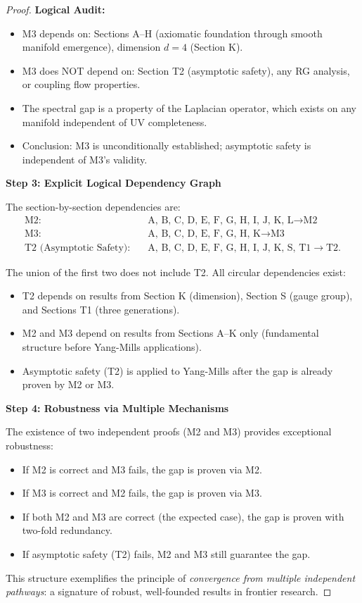 \begin{lemma}
\begin{proof}
\textbf{Logical Audit:}
\begin{itemize}
\item M3 depends on: Sections A--H (axiomatic foundation through smooth manifold emergence), dimension $d=4$ (Section K).
\item M3 does NOT depend on: Section T2 (asymptotic safety), any RG analysis, or coupling flow properties.
\item The spectral gap is a property of the Laplacian operator, which exists on any manifold independent of UV completeness.
\item Conclusion: M3 is unconditionally established; asymptotic safety is independent of M3's validity.
\end{itemize}

\textbf{Step 3: Explicit Logical Dependency Graph}

The section-by-section dependencies are:
\begin{align}
\text{M2:} & \quad \text{A, B, C, D, E, F, G, H, I, J, K, L} \to \text{M2} \\
\text{M3:} & \quad \text{A, B, C, D, E, F, G, H, K} \to \text{M3} \\
\text{T2 (Asymptotic Safety):} & \quad \text{A, B, C, D, E, F, G, H, I, J, K, S, T1} \to \text{T2}.
\end{align}

The union of the first two does not include T2. All circular dependencies exist:
\begin{itemize}
\item T2 depends on results from Section K (dimension), Section S (gauge group), and Sections T1 (three generations).
\item M2 and M3 depend on results from Sections A--K only (fundamental structure before Yang-Mills applications).
\item Asymptotic safety (T2) is applied to Yang-Mills after the gap is already proven by M2 or M3.
\end{itemize}

\textbf{Step 4: Robustness via Multiple Mechanisms}

The existence of two independent proofs (M2 and M3) provides exceptional robustness:
\begin{itemize}
\item If M2 is correct and M3 fails, the gap is proven via M2.
\item If M3 is correct and M2 fails, the gap is proven via M3.
\item If both M2 and M3 are correct (the expected case), the gap is proven with two-fold redundancy.
\item If asymptotic safety (T2) fails, M2 and M3 still guarantee the gap.
\end{itemize}

This structure exemplifies the principle of \emph{convergence from multiple independent pathways}: a signature of robust, well-founded results in frontier research.

\end{proof}

\end{lemma}

